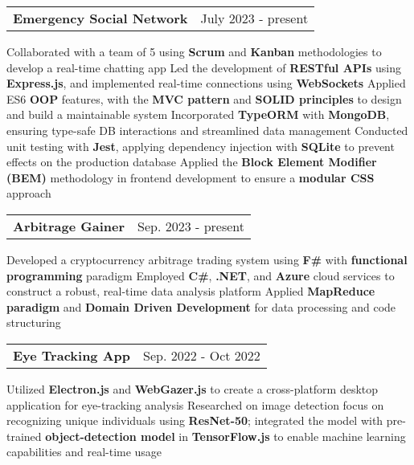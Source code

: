 \newcommand{\resumeProjEntry}[2]{
    \vspace{5pt}\item
      \begin{tabular*}{0.97\textwidth}{l@{\extracolsep{\fill}}r}
        \textbf{#1} & \small #2\\
      \end{tabular*}\vspace{-5pt}
}

\resumeProjEntry
{Emergency Social Network}
{July 2023 - present}
{
    \resumeItemListStart
        \resumeItem
        {Collaborated with a team of 5 using \textbf{Scrum} and \textbf{Kanban} methodologies to develop a real-time chatting app}
        \resumeItem
        {Led the development of \textbf{RESTful APIs} using \textbf{Express.js}, and implemented real-time connections using \textbf{WebSockets}}
        \resumeItem
        {Applied ES6 \textbf{OOP} features, with the \textbf{MVC pattern} and \textbf{SOLID principles} to design and build a maintainable system}
        \resumeItem
        {Incorporated \textbf{TypeORM} with \textbf{MongoDB}, ensuring type-safe DB interactions and streamlined data management}
        \resumeItem
        {Conducted unit testing with \textbf{Jest}, applying dependency injection with \textbf{SQLite} to prevent effects on the production database}
        \resumeItem
        {Applied the \textbf{Block Element Modifier (BEM)} methodology in frontend development to ensure a \textbf{modular CSS} approach}
    \resumeItemListEnd
}

\resumeProjEntry
{Arbitrage Gainer}
{Sep. 2023 - present}
{
    \resumeItemListStart
        \resumeItem
        {Developed a cryptocurrency arbitrage trading system using \textbf{F\#} with \textbf{functional programming} paradigm}
        \resumeItem
        {Employed \textbf{C\#}, \textbf{.NET}, and \textbf{Azure} cloud services to construct a robust, real-time data analysis platform}
        \resumeItem
        {Applied \textbf{MapReduce paradigm} and \textbf{Domain Driven Development} for data processing and code structuring}
    \resumeItemListEnd
}

\resumeProjEntry
{Eye Tracking App}
{Sep. 2022 - Oct 2022}
{
    \resumeItemListStart
        \resumeItem
        {Utilized \textbf{Electron.js} and \textbf{WebGazer.js} to create a cross-platform desktop application for eye-tracking analysis}
        \resumeItem
        {Researched on image detection focus on recognizing unique individuals using \textbf{ResNet-50}; integrated the model with pre-trained \textbf{object-detection model} in \textbf{TensorFlow.js} to enable machine learning capabilities and real-time usage}
    \resumeItemListEnd
}


